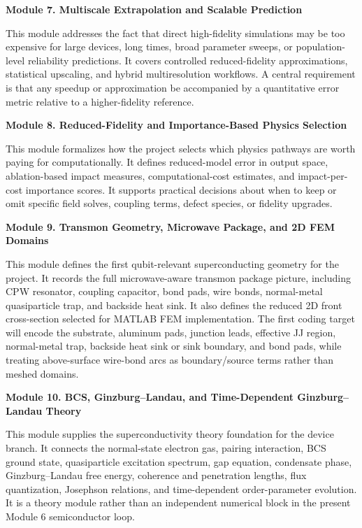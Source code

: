 \documentclass[11pt]{article}
\begin{document}
\textbf{Module 7. Multiscale Extrapolation and Scalable Prediction}

This module addresses the fact that direct high-fidelity simulations may be too expensive for large devices, long times, broad parameter sweeps, or population-level reliability predictions. It covers controlled reduced-fidelity approximations, statistical upscaling, and hybrid multiresolution workflows. A central requirement is that any speedup or approximation be accompanied by a quantitative error metric relative to a higher-fidelity reference.

\textbf{Module 8. Reduced-Fidelity and Importance-Based Physics Selection}

This module formalizes how the project selects which physics pathways are worth paying for computationally. It defines reduced-model error in output space, ablation-based impact measures, computational-cost estimates, and impact-per-cost importance scores. It supports practical decisions about when to keep or omit specific field solves, coupling terms, defect species, or fidelity upgrades.

\textbf{Module 9. Transmon Geometry, Microwave Package, and 2D FEM Domains}

This module defines the first qubit-relevant superconducting geometry for the project. It records the full microwave-aware transmon package picture, including CPW resonator, coupling capacitor, bond pads, wire bonds, normal-metal quasiparticle trap, and backside heat sink. It also defines the reduced 2D front cross-section selected for MATLAB FEM implementation. The first coding target will encode the substrate, aluminum pads, junction leads, effective JJ region, normal-metal trap, backside heat sink or sink boundary, and bond pads, while treating above-surface wire-bond arcs as boundary/source terms rather than meshed domains.

\textbf{Module 10. BCS, Ginzburg--Landau, and Time-Dependent Ginzburg--Landau Theory}

This module supplies the superconductivity theory foundation for the device branch. It connects the normal-state electron gas, pairing interaction, BCS ground state, quasiparticle excitation spectrum, gap equation, condensate phase, Ginzburg--Landau free energy, coherence and penetration lengths, flux quantization, Josephson relations, and time-dependent order-parameter evolution. It is a theory module rather than an independent numerical block in the present Module 6 semiconductor loop.
\end{document}
